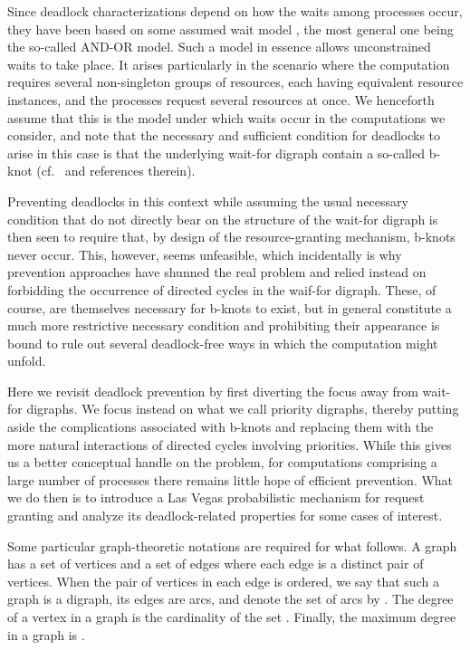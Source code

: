 \documentclass{article}
\begin{document}
Since deadlock characterizations depend on how the waits among processes occur,
they have been based on some assumed wait model
\cite{MisraChandy, BrachaToueg, KshemkalyaniSinghal, RyangPark, BrzezinskiHelaryRaynalSinghal, Barbosa99thecombinatorics},
the most general one being the so-called AND-OR model. Such a model in essence
allows unconstrained waits to take place. It arises particularly in the scenario
where the computation requires several non-singleton groups of resources, each
having equivalent resource instances, and the processes request several
resources at once. We henceforth assume that this is the model under which waits
occur in the computations we consider, and note that the necessary and
sufficient condition for deadlocks to arise in this case is that the underlying
wait-for digraph contain a so-called b-knot
(cf.~\cite{Barbosa99thecombinatorics} and references therein). 

Preventing deadlocks in this context while assuming the usual necessary
condition that do not directly bear on the structure of the wait-for digraph is
then seen to require that, by design of the resource-granting mechanism, b-knots
never occur. This, however, seems unfeasible, which incidentally is why
prevention approaches have shunned the real problem and relied instead on
forbidding the occurrence of directed cycles in the waif-for digraph. These, of
course, are themselves necessary for b-knots to exist, but in general constitute
a much more restrictive necessary condition and prohibiting their appearance is
bound to rule out several deadlock-free ways in which the computation might
unfold. 

Here we revisit deadlock prevention by first diverting the focus away from
wait-for digraphs. We focus instead on what we call priority digraphs, thereby
putting aside the complications associated with b-knots and replacing them with
the more natural interactions of directed cycles involving priorities. While
this gives us a better conceptual handle on the problem, for computations
comprising a large number of processes there remains little hope of efficient
prevention. What we do then is to introduce a Las Vegas probabilistic mechanism
for request granting and analyze its deadlock-related properties for some cases
of interest.

Some particular graph-theoretic notations are required for what follows. A graph
 has a set  of vertices and a set  of edges where each edge is a
distinct pair of vertices. When the pair of vertices in each edge is ordered, we
say that such a graph is a digraph, its edges are arcs, and denote the set of
arcs by . The degree  of a vertex  in a graph  is the
cardinality of the set . Finally, the
maximum degree in a graph  is
. 
\end{document}
